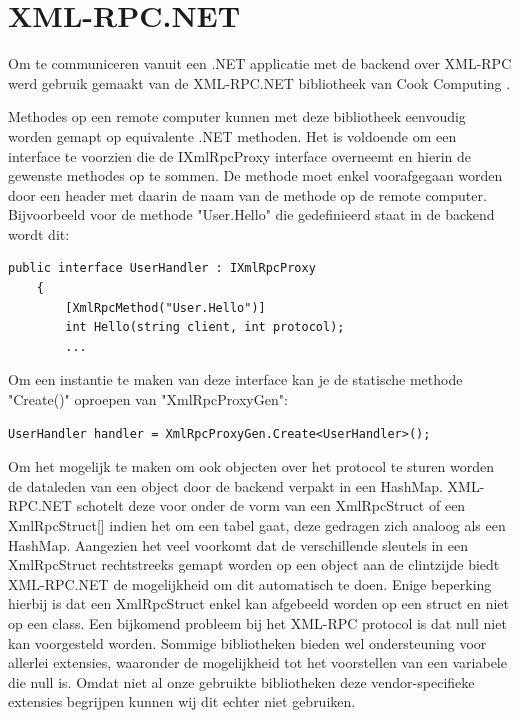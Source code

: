 \section{XML-RPC.NET}

Om te communiceren vanuit een .NET applicatie met de backend over XML-RPC werd gebruik gemaakt van de XML-RPC.NET bibliotheek van Cook Computing .

Methodes op een remote computer kunnen met deze bibliotheek eenvoudig worden gemapt op equivalente .NET methoden. Het is voldoende om een interface te voorzien die de IXmlRpcProxy interface overneemt en hierin de gewenste methodes op te sommen. De methode moet enkel voorafgegaan worden door een header met daarin de naam van de methode op de remote computer. Bijvoorbeeld voor de methode "User.Hello" die gedefinieerd staat in de backend wordt dit:

\begin{verbatim}
public interface UserHandler : IXmlRpcProxy
	{
	    [XmlRpcMethod("User.Hello")]
	    int Hello(string client, int protocol);
	    ...
\end{verbatim}

Om een instantie te maken van deze interface kan je de statische methode "Create()" oproepen van "XmlRpcProxyGen":

\begin{verbatim}
UserHandler handler = XmlRpcProxyGen.Create<UserHandler>();
\end{verbatim}

Om het mogelijk te maken om ook objecten over het protocol te sturen worden de dataleden van een object door de backend verpakt in een HashMap. XML-RPC.NET schotelt deze voor onder de vorm van een XmlRpcStruct of een XmlRpcStruct[] indien het om een tabel gaat, deze gedragen zich analoog als een HashMap. Aangezien het veel voorkomt dat de verschillende sleutels in een XmlRpcStruct rechtstreeks gemapt worden op een object aan de clintzijde biedt XML-RPC.NET de mogelijkheid om dit automatisch te doen. Enige beperking hierbij is dat een XmlRpcStruct enkel kan afgebeeld worden op een struct en niet op een class. Een bijkomend probleem bij het XML-RPC protocol is dat null niet kan voorgesteld worden. Sommige bibliotheken bieden wel ondersteuning voor allerlei extensies, waaronder de mogelijkheid tot het voorstellen van een variabele die null is. Omdat niet al onze gebruikte bibliotheken deze vendor-specifieke extensies begrijpen kunnen wij dit echter niet gebruiken.

